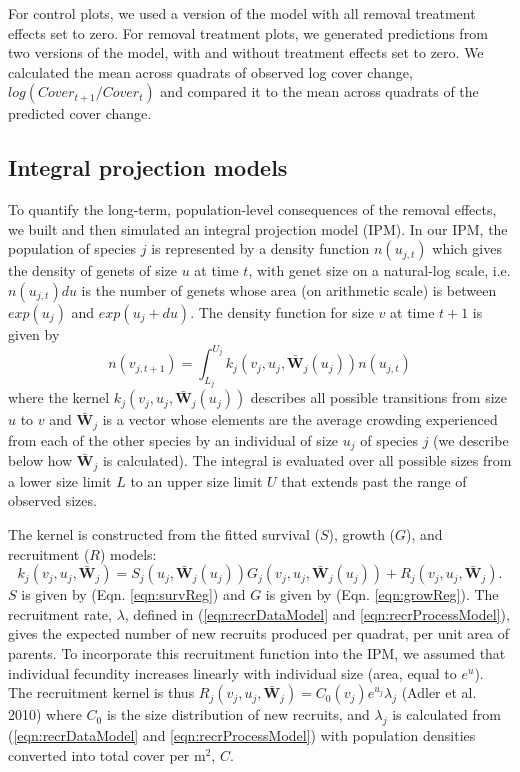 \documentclass[11pt]{article}
\begin{document}
\begin{doublespacing}
For control plots, we used a version of the model with all removal treatment effects set to zero. For removal treatment plots, we generated predictions from two versions of the model, with and without treatment effects set to zero.  We calculated the mean across quadrats of observed log cover change, $log(Cover_{t+1}/Cover_t)$ and compared it to the mean across quadrats of the predicted cover change.

\subsection*{Integral projection models}

To quantify the long-term, population-level consequences of the removal effects, we built and then simulated an integral projection model (IPM). In our IPM, the population of species $j$ is represented by a density function $n(u_{j,t})$ which gives the density of genets of size $u$ at time $t$, with genet size on a natural-log scale, i.e. $n(u_{j,t})du$ is the number of genets whose area (on arithmetic scale) is between $exp(u_j)$ and $exp(u_j+du)$. The density function for size $v$ at time $t+1$ is given by
\begin{equation}
n(v_{j,t+1})=\int_{L_j}^{U_j} k_j (v_j,u_j,\boldsymbol{\bar{W}}_j  (u_j))n(u_{j,t})   
\label{eqn:IPM}
\end{equation}
where the kernel $k_j (v_j,u_j,\boldsymbol{\bar{W}}_j  (u_j))$ describes all possible transitions from size $u$ to $v$ and $\boldsymbol{\bar{W}}_j$  is a vector whose elements are the average crowding experienced from each of the other species by an individual of size $u_j$ of species $j$ (we describe below how $\boldsymbol{\bar{W}}_j$ is calculated). The integral is evaluated over all possible sizes from a lower size limit $L$ to an upper size limit $U$ that extends past the range of observed sizes.   

The kernel is constructed from the fitted survival ($S$), growth ($G$), and recruitment ($R$) models:
\begin{equation}
k_j (v_j,u_j,\boldsymbol{\bar{W}}_j ) = S_j(u_j,\boldsymbol{\bar{W}}_j  (u_j)) G_j(v_j,u_j,\boldsymbol{\bar{W}}_j  (u_j)) 
+ R_j (v_j,u_j,\boldsymbol{\bar{W}}_j) .
\label{eqn:IPM} 
\end{equation}
$S$ is given by (Eqn. \ref{eqn:survReg}) and $G$ is given by (Eqn. \ref{eqn:growReg}). The recruitment rate, $\lambda$, 
defined in (\ref{eqn:recrDataModel} and \ref{eqn:recrProcessModel}), gives the expected 
number of new recruits produced per quadrat, per unit area of parents. To incorporate this recruitment function into the IPM, 
we assumed that individual fecundity increases linearly with individual size (area, equal to $e^u$). The recruitment kernel is thus
$R_j(v_j,u_j,\boldsymbol{\bar{W}}_j)=C_0(v_j)e^{u_j}\lambda_j$ (Adler et al. 2010) where $C_0$ is the
size distribution of new recruits, and $\lambda_j$ is calculated from (\ref{eqn:recrDataModel} and \ref{eqn:recrProcessModel}) with
population densities converted into total cover per m$^2$, $C$. 


\end{doublespacing}
\end{document}
